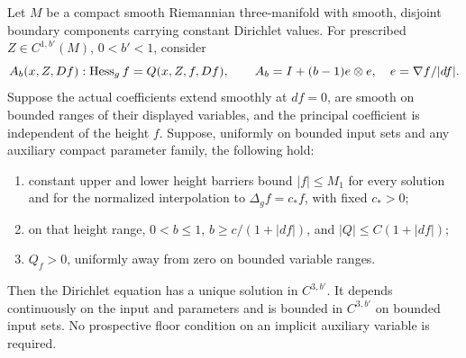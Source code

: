 \begin{proposition}
\label{prop:fc-trace-solve}
Let $M$ be a compact smooth Riemannian three-manifold with smooth,
disjoint boundary components carrying constant Dirichlet values.
For prescribed $Z\in C^{1,b'}(M)$, $0<b'<1$, consider
\begin{equation}\label{eq:fc-general-trace}
 A_b(x,Z,Df):\operatorname{Hess}_g f=Q(x,Z,f,Df),
 \qquad A_b=I+(b-1)e\otimes e,
 \quad e=\nabla f/|df|.
\end{equation}
Suppose the actual coefficients extend smoothly at $df=0$, are
smooth on bounded ranges of their displayed variables, and the
principal coefficient is independent of the height $f$.
Suppose, uniformly on bounded input sets and any auxiliary compact
parameter family, the following hold:
\begin{enumerate}[label=(\roman*)]
 \item constant upper and lower height barriers bound $|f|\le M_1$
 for every solution and for the normalized interpolation to
 $\Delta_g f=c_*f$, with fixed $c_*>0$;
 \item on that height range, $0<b\le1$,
 $b\ge c/(1+|df|)$, and $|Q|\le C(1+|df|)$;
 \item $Q_f>0$, uniformly away from zero on bounded variable
 ranges.
\end{enumerate}
Then the Dirichlet equation has a unique solution in $C^{3,b'}$.
It depends continuously on the input and parameters and is bounded
in $C^{3,b'}$ on bounded input sets.  No prospective floor
condition on an implicit auxiliary variable is required.
\end{proposition}

